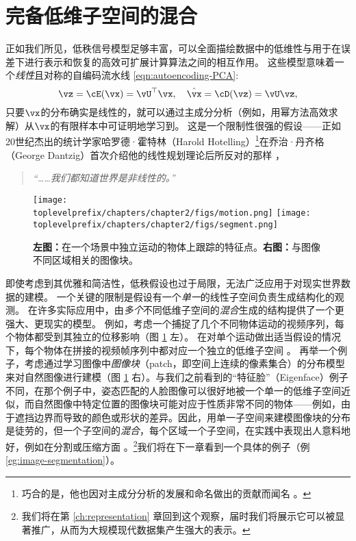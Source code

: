 \documentclass[../../book-main_zh.tex]{subfiles}
\begin{document}
\section{完备低维子空间的混合}%
\label{sec:ica}
正如我们所见，低秩信号模型足够丰富，可以全面描绘数据中的低维性与用于在误差下进行表示和恢复的高效可扩展计算算法之间的相互作用。
这些模型意味着一个\textit{线性}且对称的自编码流水线 \eqref{eqn:autoencoding-PCA}: 
\begin{equation*}
    \vz = \cE(\vx) = \vU^\top \vx, \quad \hat{\vx} = \cD(\vz) = \vU \vz,
\end{equation*}
只要$\vx$的分布确实是线性的，就可以通过主成分分析（例如，用幂方法高效求解）从$\vx$的有限样本中可证明地学习到。
这是一个限制性很强的假设——正如20世纪杰出的统计学家哈罗德·霍特林（Harold Hotelling）\footnote{巧合的是，他也因对主成分分析的发展和命名做出的贡献而闻名 \cite{Hotelling1933}。}在乔治·丹齐格（George Dantzig）首次介绍他的线性规划理论后所反对的那样 \cite{Dantzig2002-eh}，
\begin{quote}
\centering
    \textit{“……我们都知道世界是非线性的。”}
\end{quote}


\begin{figure}
    \centering
    \texttt{[image: \\toplevelprefix/chapters/chapter2/figs/motion.png]} \hspace{5mm}
    \texttt{[image: \\toplevelprefix/chapters/chapter2/figs/segment.png]} 
    \caption{\textbf{左图：}在一个场景中独立运动的物体上跟踪的特征点。\textbf{右图：}与图像不同区域相关的图像块。}
    \label{fig:multiple-subspaces}
\end{figure}
即使考虑到其优雅和简洁性，低秩假设也过于局限，无法广泛应用于对现实世界数据的建模。
一个关键的限制是假设有一个\textit{单一}的线性子空间负责生成结构化的观测。
在许多实际应用中，由\textit{多个}不同低维子空间的\textit{混合}生成的结构提供了一个更强大、更现实的模型。
例如，考虑一个捕捉了几个不同物体运动的视频序列，每个物体都受到其独立的位移影响（图 \ref{fig:multiple-subspaces} 左）。
在对单个运动做出适当假设的情况下，每个物体在拼接的视频帧序列中都对应一个独立的低维子空间 \cite{VidalR2004-ECCV}。
再举一个例子，考虑通过学习图像中\textit{图像块}（patch，即空间上连续的像素集合）的分布模型来对自然图像进行建模（图 \ref{fig:multiple-subspaces} 右）。与我们之前看到的“特征脸”（Eigenface）例子不同，在那个例子中，姿态匹配的人脸图像可以很好地被一个单一的低维子空间近似，而自然图像中特定位置的图像块可能对应于性质非常不同的物体——例如，由于遮挡边界而导致的颜色或形状的差异。因此，用单一子空间来建模图像块的分布是徒劳的，但一个子空间的\textit{混合}，每个区域一个子空间，在实践中表现出人意料地好，例如在分割或压缩方面 \cite{Mobahi-IJCV2011}。\footnote{我们将在第 \ref{ch:representation} 章回到这个观察，届时我们将展示它可以被显著推广，从而为大规模现代数据集产生强大的表示。}我们将在下一章看到一个具体的例子（例 \ref{eg:image-segmentation}）。
\end{document}
